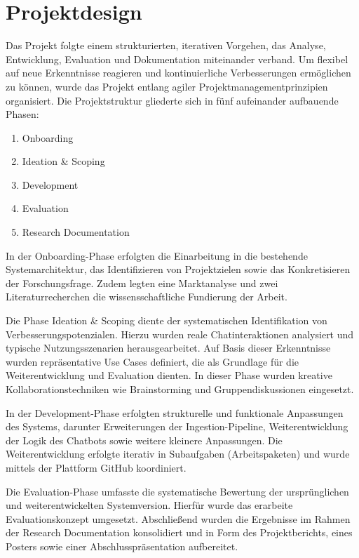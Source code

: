 \chapter{Projektdesign}
\label{sec:projektdesign}

Das Projekt folgte einem strukturierten, iterativen Vorgehen, das Analyse, Entwicklung, Evaluation und Dokumentation miteinander verband. Um flexibel auf neue Erkenntnisse reagieren und kontinuierliche Verbesserungen ermöglichen zu können, wurde das Projekt entlang agiler Projektmanagementprinzipien organisiert. Die Projektstruktur gliederte sich in fünf aufeinander aufbauende Phasen:
\begin{enumerate}
    \item Onboarding
    \item Ideation \& Scoping
    \item Development
    \item Evaluation
    \item Research Documentation
\end{enumerate}
In der Onboarding-Phase erfolgten die Einarbeitung in die bestehende Systemarchitektur, das Identifizieren von Projektzielen sowie das Konkretisieren der Forschungsfrage. Zudem legten eine Marktanalyse und zwei Literaturrecherchen die wissensschaftliche Fundierung der Arbeit.

Die Phase Ideation \& Scoping diente der systematischen Identifikation von Verbesserungspotenzialen. Hierzu wurden reale Chatinteraktionen analysiert und typische Nutzungsszenarien herausgearbeitet. Auf Basis dieser Erkenntnisse wurden repräsentative Use Cases definiert, die als Grundlage für die Weiterentwicklung und Evaluation dienten. In dieser Phase wurden kreative Kollaborationstechniken wie Brainstorming und Gruppendiskussionen eingesetzt.

In der Development-Phase erfolgten strukturelle und funktionale Anpassungen des Systems, darunter Erweiterungen der Ingestion-Pipeline, Weiterentwicklung der Logik des Chatbots sowie weitere kleinere Anpassungen. Die Weiterentwicklung erfolgte iterativ in Subaufgaben (Arbeitspaketen) und wurde mittels der Plattform GitHub koordiniert.

Die Evaluation-Phase umfasste die systematische Bewertung der ursprünglichen und weiterentwickelten Systemversion. Hierfür wurde das erarbeite Evaluationskonzept umgesetzt. Abschließend wurden die Ergebnisse im Rahmen der Research Documentation konsolidiert und in Form des Projektberichts, eines Posters sowie einer Abschlusspräsentation aufbereitet.

